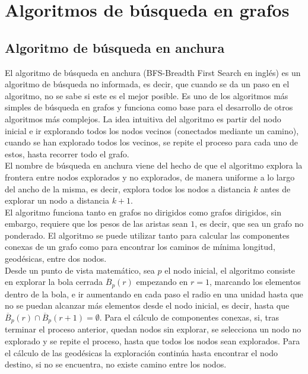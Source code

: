 
\chapter{Algoritmos de búsqueda en grafos}\label{ch:tercer-capitulo}

\section{Algoritmo de búsqueda en anchura}

El algoritmo de búsqueda en anchura (BFS-Breadth First Search en inglés) es un algoritmo de búsqueda no informada, es decir, que cuando se da un paso en el algoritmo, no se sabe si este es el mejor posible. Es uno de los algoritmos más simples de búsqueda en grafos y funciona como base para el desarrollo de otros algoritmos más complejos. La idea intuitiva del algoritmo es partir del nodo inicial e ir explorando todos los nodos vecinos (conectados mediante un camino), cuando se han explorado todos los vecinos, se repite el proceso para cada uno de estos, hasta recorrer todo el grafo. \\

El nombre de búsqueda en anchura viene del hecho de que el algoritmo explora la frontera entre nodos explorados y no explorados, de manera uniforme a lo largo del ancho de la misma, es decir, explora todos los nodos a distancia $k$ antes de explorar un nodo a distancia $k+1$. \\

El algoritmo funciona tanto en grafos no dirigidos como grafos dirigidos, sin embargo, requiere que los pesos de las aristas sean $1$, es decir, que sea un grafo no ponderado. El algoritmo se puede utilizar tanto para calcular las componentes conexas de un grafo como para encontrar los caminos de mínima longitud, geodésicas, entre dos nodos. \\

Desde un punto de vista matemático, sea $p$ el nodo inicial, el algoritmo consiste en explorar la bola cerrada $\overline B_p(r)$ empezando en $r=1$, marcando los elementos dentro de la bola, e ir aumentando en cada paso el radio en una unidad hasta que no se puedan alcanzar más elementos desde el nodo inicial, es decir, hasta que $\overline B_p(r)\cap \overline B_p(r+1) = \emptyset$. Para el cálculo de componentes conexas, si, tras terminar el proceso anterior, quedan nodos sin explorar, se selecciona un nodo no explorado y se repite el proceso, hasta que todos los nodos sean explorados. Para el cálculo de las geodésicas la exploración continúa hasta encontrar el nodo destino, si no se encuentra, no existe camino entre los nodos.

